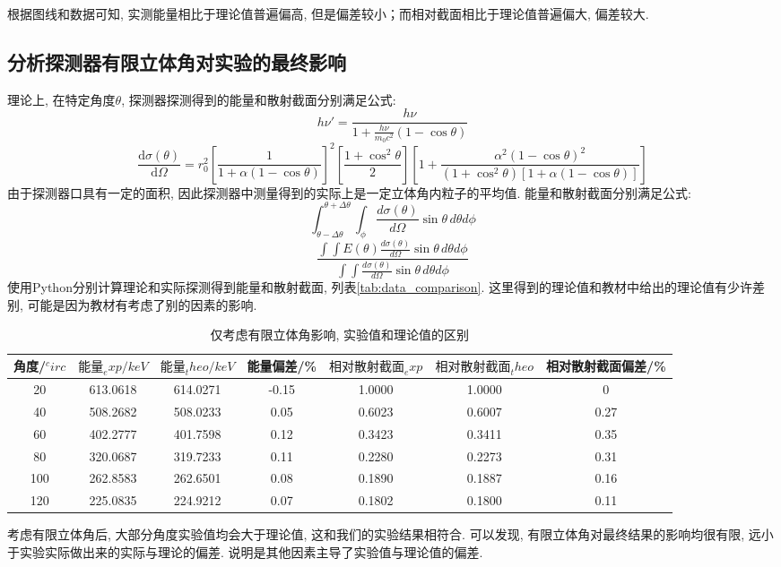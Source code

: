 \documentclass[font=default]{mpltx}
\begin{document}
      根据图线和数据可知, 实测能量相比于理论值普遍偏高, 但是偏差较小；而相对截面相比于理论值普遍偏大, 偏差较大.

    \subsection{分析探测器有限立体角对实验的最终影响}
      理论上, 在特定角度$\theta$, 探测器探测得到的能量和散射截面分别满足公式: 
      $$
      h\nu' = \frac{h\nu}{1 + \frac{h\nu}{m_0 c^2}(1 - \cos\theta)}
      $$
      $$
      \frac{\mathrm{d}\sigma(\theta)}{\mathrm{d}\Omega} = r_0^2 \left[ \frac{1}{1 + \alpha(1 - \cos\theta)} \right]^2 \left[ \frac{1 + \cos^2\theta}{2} \right] \left[ 1 + \frac{\alpha^2(1 - \cos\theta)^2}{(1 + \cos^2\theta)\left[ 1 + \alpha(1 - \cos\theta) \right]} \right]
      $$
      由于探测器口具有一定的面积, 因此探测器中测量得到的实际上是一定立体角内粒子的平均值. 能量和散射截面分别满足公式:
      $$
      \int_{\theta-\Delta\theta}^{\theta+\Delta\theta} \int_{\phi} \frac{d\sigma(\theta)}{d\Omega} \sin\theta \, d\theta d\phi    
      $$
      $$
      \frac{\int\int E(\theta) \frac{d\sigma(\theta)}{d\Omega} \sin\theta \, d\theta d\phi}{\int\int \frac{d\sigma(\theta)}{d\Omega} \sin\theta \, d\theta d\phi}
      $$
      使用Python分别计算理论和实际探测得到能量和散射截面, 列表\autoref{tab:data_comparison}.
      这里得到的理论值和教材\cite{jindaiwulishiyan}中给出的理论值有少许差别, 可能是因为教材有考虑了别的因素的影响. 
      
      \begin{table}[htbp]
        \centering
        \caption{仅考虑有限立体角影响, 实验值和理论值的区别}
        \begin{tabular}{ccccccc}
          \toprule
           角度/$^circ$ & $能量_exp/keV$ & $能量_theo/keV$ & 能量偏差/\% & $相对散射截面_exp$ & $相对散射截面_theo$ & 相对散射截面偏差/\%\\
          \midrule
           20 & 613.0618 & 614.0271 & -0.15 & 1.0000 & 1.0000 & 0\\
           40 & 508.2682 & 508.0233 & 0.05 & 0.6023 & 0.6007 & 0.27\\
           60 & 402.2777 & 401.7598 & 0.12 & 0.3423 & 0.3411 & 0.35 \\
           80 & 320.0687 & 319.7233 & 0.11 & 0.2280 & 0.2273 & 0.31\\
           100 & 262.8583 & 262.6501 & 0.08 & 0.1890 & 0.1887 & 0.16\\
           120 & 225.0835 & 224.9212 & 0.07 & 0.1802 & 0.1800 & 0.11\\
          \bottomrule
        \end{tabular}
        \label{tab:data_comparison}
      \end{table}
      考虑有限立体角后, 大部分角度实验值均会大于理论值, 这和我们的实验结果相符合. 
      可以发现, 有限立体角对最终结果的影响均很有限, 远小于实验实际做出来的实际与理论的偏差. 说明是其他因素主导了实验值与理论值的偏差. 
\end{document}
